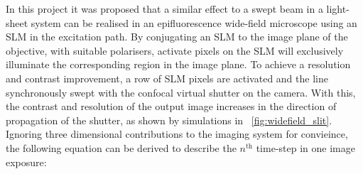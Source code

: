 In this project it was proposed that a similar effect to a swept beam in a \gls{light-sheet} system can be realised in an epifluorescence \gls{wide-field} microscope using an \gls{SLM} in the excitation path.
By conjugating an \gls{SLM} to the image plane of the objective, with suitable polarisers, activate pixels on the \gls{SLM} will exclusively illuminate the corresponding region in the image plane.
To achieve a resolution and contrast improvement, a row of \gls{SLM} pixels are activated and the line synchronously swept with the confocal virtual shutter on the camera.
With this, the contrast and resolution of the output image increases in the direction of propagation of the shutter, as shown by simulations in \figurename~\ref{fig:widefield_slit}.
Ignoring three dimensional contributions to the imaging system for convieince, the following equation can be derived to describe the \(n^\text{th}\) time-step in one image exposure:
